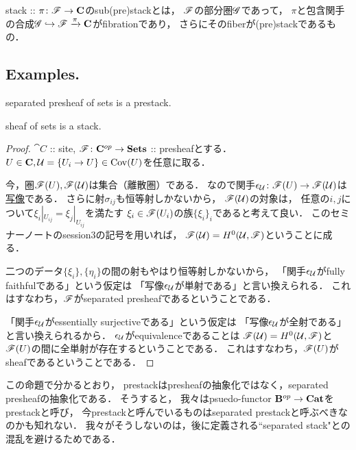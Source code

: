 \documentclass[a4paper, dvipdfmx]{jsarticle}
\begin{document}
\begin{Def}
    stack :: $\pi \colon \mathscr{F} \to \mathbf{C}$のsub(pre)stackとは，
    $\mathscr{F}$の部分圏$\mathscr{G}$であって，
    $\pi$と包含関手の合成$\mathscr{G} \hookrightarrow \mathscr{F} \xrightarrow{\pi} \mathbf{C}$がfibrationであり，
    さらにそのfiberが(pre)stackであるもの．
\end{Def}

\subsection{Examples.}
\begin{Prop}
    \begin{myenum}
        \item separated presheaf of sets is a prestack.
        \item sheaf of sets is a stack.
    \end{myenum}
\end{Prop}
\begin{proof}
    $\cat{C}$ :: site, $\mathscr{F} \colon \mathbf{C}^{op} \to \mathbf{Sets}$ :: presheafとする．
    $U \in \mathbf{C}, \mathcal{U}=\{U_i \to U\} \in \operatorname{Cov}(U)$を任意に取る．

    今，圏$\mathscr{F}(U), \mathscr{F}(\mathcal{U})$は集合（離散圏）である．
    なので関手$\epsilon_{\mathcal{U}} \colon \mathscr{F}(U) \to \mathscr{F}(\mathcal{U})$は\underline{写像}である．
    さらに射$\sigma_{ij}$も恒等射しかないから，
    $\mathscr{F}(\mathcal{U})$の対象は，
    任意の$i,j$について$\xi_i|_{U_{ij}}=\xi_j|_{U_{ij}}$を満たす
    $\xi_i \in \mathscr{F}(U_i)$の族$\{\xi_i\}_i$であると考えて良い．
    このセミナーノートのsession3の記号を用いれば，
    $\mathscr{F}(\mathcal{U})=H^0(\mathcal{U}, \mathscr{F})$ということに成る．

    二つのデータ$\{\xi_i\}, \{\eta_i\}$の間の射もやはり恒等射しかないから，
    「関手$\epsilon_{\mathcal{U}}$がfully faithfulである」という仮定は
    「写像$\epsilon_{\mathcal{U}}$が単射である」と言い換えられる．
    これはすなわち，$\mathscr{F}$がseparated presheafであるということである．

    「関手$\epsilon_{\mathcal{U}}$がessentially surjectiveである」という仮定は
    「写像$\epsilon_{\mathcal{U}}$が全射である」と言い換えられるから．
    $\epsilon_{\mathcal{U}}$がequivalenceであることは
    $\mathscr{F}(\mathcal{U})=H^0(\mathcal{U}, \mathscr{F})$と$\mathscr{F}(U)$の間に全単射が存在するということである．
    これはすなわち，$\mathscr{F}(U)$がsheafであるということである．
\end{proof}

\begin{Remark}
    この命題で分かるとおり，
    prestackはpresheafの抽象化ではなく，separated presheafの抽象化である．
    そうすると，
    我々はpsuedo-functor $\mathbf{B}^{op} \to \mathbf{Cat}$をprestackと呼び，
    今prestackと呼んでいるものはseparated prestackと呼ぶべきなのかも知れない．
    我々がそうしないのは，後に定義される``separated stack"との混乱を避けるためである．
\end{Remark}
\end{document}

